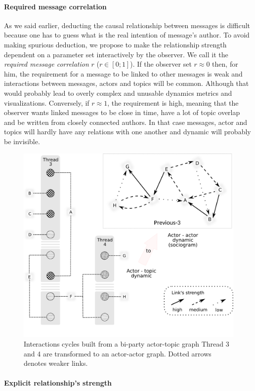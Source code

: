 \documentclass[a4paper,twoside]{article}
\begin{document}
\paragraph{Required message correlation}

As we said earlier, deducting the causal relationship between messages is difficult because one has to guess what is the real intention of message's author.  To avoid making spurious deduction, we propose to make the relationship strength dependent on a parameter set interactively by the observer.  We call it the \emph{required message correlation} $r$ ($r\in[0;1]$).  If the observer set $r \approx 0$ then, for him, the requirement for a message to be linked to other messages is weak and interactions between messages, actors and topics will be common.  Although that would probably lead to overly complex and unusable dynamics metrics and visualizations.  Conversely, if $r\approx 1$, the requirement is high, meaning that the observer wants linked messages to be close in time, have a lot of topic overlap and be written from closely connected authors.  In that case messages, actor and topics will hardly have any relations with one another and dynamic will probably be invisible.

\begin{figure}[t]
  \includegraphics[width=.5\textwidth]{images/cycles.png}
  \small{
    \caption{\label{fig:cycles}
      Interactions cycles built from a bi-party actor-topic graph  Thread 3 and 4 are transformed to an actor-actor graph.  Dotted arrows denotes weaker links.
    }}
\end{figure}
 

\paragraph{Explicit relationship's strength}

\end{document}
